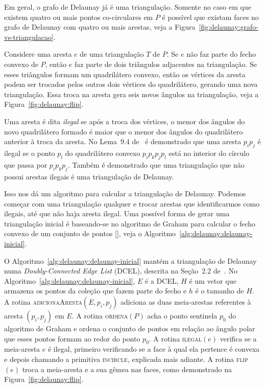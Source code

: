 

Em geral, o grafo de Delaunay já é uma triangulação.
Somente no caso em que existem quatro ou mais pontos co-circulares em $P$ é possível que existam
faces no grafo de Delaunay com quatro ou mais arestas, veja a
Figura~\ref{fig:delaunay:grafo-vs-triangulacao}.



Considere uma aresta $e$ de uma triangulação $T$ de $P$.
Se $e$ não faz parte do fecho convexo de $P$, então $e$ faz parte de dois triângulos adjacentes na
triangulação.
Se esses triângulos formam um quadrilátero convexo, então os vértices da aresta podem ser trocados
pelos outros dois vértices do quadrilátero, gerando uma nova triangulação.
Essa troca na aresta gera seis novos ângulos na triangulação, veja a
Figura~\ref{fig:delaunay:flip}.



Uma aresta é dita \textit{ilegal} se após a troca dos vértices, o menor dos ângulos do novo
quadrilátero formado é maior que o menor dos ângulos do quadrilátero anterior à troca da aresta.
No Lema~$9.4$ de~\cite{computationalgeometry} é demonstrado que uma aresta $p_{i}p_{j}$ é ilegal
se o ponto $p_{l}$ do quadrilátero convexo $p_{i}p_{k}p_{j}p_{l}$ está no interior do círculo que
passa por $p_{i}p_{k}p_{j}$.
Também é demonstrado que uma triangulação que não possui arestas ilegais é uma triangulação de
Delaunay.

Isso nos dá um algoritmo para calcular a triangulação de Delaunay.
Podemos começar com uma triangulação qualquer e trocar arestas que identificarmos como ilegais,
até que não haja aresta ilegal.
Uma possível forma de gerar uma triangulação inicial é baseando-se no algoritmo de Graham para
calcular o fecho convexo de um conjunto de pontos [\cite{Graham1972AnEA}], veja o
Algoritmo~\ref{alg:delaunay:delaunay-inicial}.

O Algoritmo~\ref{alg:delaunay:delaunay-inicial} mantém a triangulação de Delaunay numa
\textit{Doubly-Connected Edge List} (DCEL), descrita na Seção~2.2 de~\cite{computationalgeometry}.
No Algoritmo~\ref{alg:delaunay:delaunay-inicial}, $E$ é a DCEL, $H$ é um vetor que armazena os
pontos da coleção que fazem parte do fecho e $h$ é o tamanho de $H$.
A rotina \textsc{adicionaAresta}$(E, p_i, p_j)$ adiciona as duas meia-arestas referentes à aresta
$(p_i, p_j)$ em $E$.
A rotina \textsc{ordena}$(P)$ acha o ponto sentinela $p_0$ do algoritmo de Graham e ordena o
conjunto de pontos em relação ao ângulo polar que esses pontos formam ao redor do ponto $p_0$.
A rotina \textsc{ilegal}$(e)$ verifica se a meia-aresta $e$ é ilegal, primeiro verificando se a
face à qual ela pertence é convexa e depois chamando a primitiva \textsc{incircle}, explicada mais
adiante.
A rotina \textsc{flip}$(e)$ troca a meia-aresta e a sua gêmea nas faces, como demonstrado na
Figura~\ref{fig:delaunay:flip}.

